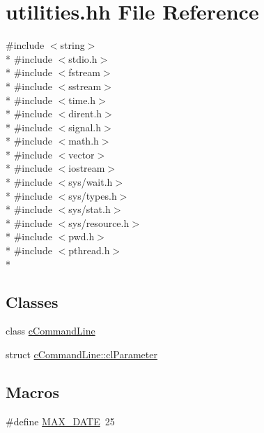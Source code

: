 \hypertarget{utilities_8hh}{\section{utilities.\-hh File Reference}
\label{utilities_8hh}
}
{\ttfamily \#include $<$string$>$}\\*
{\ttfamily \#include $<$stdio.\-h$>$}\\*
{\ttfamily \#include $<$fstream$>$}\\*
{\ttfamily \#include $<$sstream$>$}\\*
{\ttfamily \#include $<$time.\-h$>$}\\*
{\ttfamily \#include $<$dirent.\-h$>$}\\*
{\ttfamily \#include $<$signal.\-h$>$}\\*
{\ttfamily \#include $<$math.\-h$>$}\\*
{\ttfamily \#include $<$vector$>$}\\*
{\ttfamily \#include $<$iostream$>$}\\*
{\ttfamily \#include $<$sys/wait.\-h$>$}\\*
{\ttfamily \#include $<$sys/types.\-h$>$}\\*
{\ttfamily \#include $<$sys/stat.\-h$>$}\\*
{\ttfamily \#include $<$sys/resource.\-h$>$}\\*
{\ttfamily \#include $<$pwd.\-h$>$}\\*
{\ttfamily \#include $<$pthread.\-h$>$}\\*
\subsection*{Classes}
\begin{DoxyCompactItemize}
\item 
class \hyperlink{classcCommandLine}{c\-Command\-Line}
\item 
struct \hyperlink{structcCommandLine_1_1clParameter}{c\-Command\-Line\-::cl\-Parameter}
\end{DoxyCompactItemize}
\subsection*{Macros}
\begin{DoxyCompactItemize}
\item 
\#define \hyperlink{utilities_8hh_ab2854f198e119d1843f14002a2621aa7}{M\-A\-X\-\_\-\-D\-A\-T\-E}~25
\end{DoxyCompactItemize}
